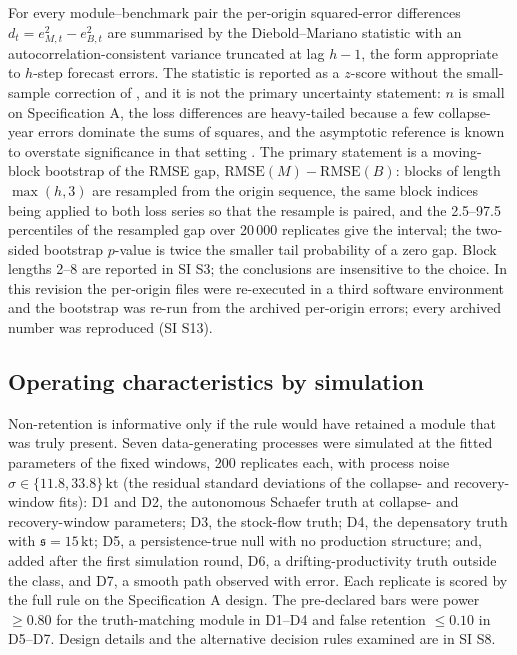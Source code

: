 \documentclass[preprint,11pt,authoryear]{elsarticle}
\theoremstyle{definition}
\theoremstyle{remark}
\newcommand{\kt}{\,\mathrm{kt}}
\newcommand{\RMSE}{\mathrm{RMSE}}
\newcommand{\sA}{\mathfrak{s}}
\begin{document}
For every module--benchmark pair the per-origin squared-error differences $d_t = e^2_{M,t} - e^2_{B,t}$ are summarised by the Diebold--Mariano statistic \citep{Diebold1995} with an autocorrelation-consistent variance truncated at lag $h-1$, the form appropriate to $h$-step forecast errors. The statistic is reported as a $z$-score without the small-sample correction of \citet{Harvey1997}, and it is not the primary uncertainty statement: $n$ is small on Specification A, the loss differences are heavy-tailed because a few collapse-year errors dominate the sums of squares, and the asymptotic reference is known to overstate significance in that setting \citep{Diebold2015}. The primary statement is a moving-block bootstrap \citep{Kunsch1989} of the RMSE gap, $\RMSE(M)-\RMSE(B)$: blocks of length $\max(h,3)$ are resampled from the origin sequence, the same block indices being applied to both loss series so that the resample is paired, and the 2.5--97.5 percentiles of the resampled gap over 20\,000 replicates give the interval; the two-sided bootstrap $p$-value is twice the smaller tail probability of a zero gap. Block lengths 2--8 are reported in SI S3; the conclusions are insensitive to the choice. In this revision the per-origin files were re-executed in a third software environment and the bootstrap was re-run from the archived per-origin errors; every archived number was reproduced (SI S13).

\subsection{Operating characteristics by simulation}\label{sec:simdesign}

Non-retention is informative only if the rule would have retained a module that was truly present. Seven data-generating processes were simulated at the fitted parameters of the fixed windows, 200 replicates each, with process noise $\sigma \in \{11.8, 33.8\}\kt$ (the residual standard deviations of the collapse- and recovery-window fits): D1 and D2, the autonomous Schaefer truth at collapse- and recovery-window parameters; D3, the stock-flow truth; D4, the depensatory truth with $\sA = 15\kt$; D5, a persistence-true null with no production structure; and, added after the first simulation round, D6, a drifting-productivity truth outside the class, and D7, a smooth path observed with error. Each replicate is scored by the full rule on the Specification A design. The pre-declared bars were power $\ge 0.80$ for the truth-matching module in D1--D4 and false retention $\le 0.10$ in D5--D7. Design details and the alternative decision rules examined are in SI S8.
\end{document}

